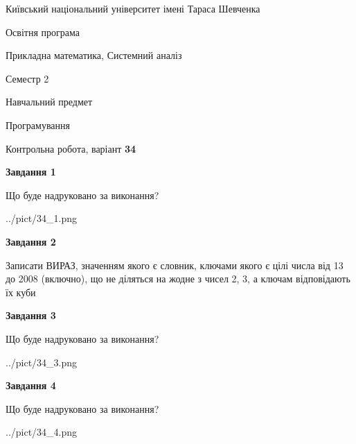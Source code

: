 \documentclass[12pt, ukrainian]{article}
\begin{document}
{{\begin {small}\par
{ \center  Київський національний університет імені Тараса Шевченка \par}
{\parbox {5 cm}{Освітня програма \hfill}{\parbox {8 cm}{Прикладна математика, Системний аналіз \hfill}}\parbox {5 cm}{\hfill Семестр 2}}\par
{\parbox {5 cm} {Навчальний предмет \hfill}\parbox {7 cm}{Програмування \hfill}\parbox {6cm}{\hfill}\par}\vspace{-7pt} \end{small}}{\center Контрольна робота, варіант  \No \textbf
{ 34 }\par}}
{
\begin {large}
{\begin {center}\textbf{Завдання 1}\end {center}}\par
Що буде надруковано за виконання?\par\par
\begin{center}
	{../pict/34_1.png}
\end{center}
\newpage

{\begin {center}\textbf{Завдання 2}\end {center}}\par
Записати ВИРАЗ, значенням якого є словник, ключами якого є цілі числа від 13 до 2008 (включно), що не діляться на жодне з чисел 2, 3, а ключам відповідають їх куби\par
\newpage

{\begin {center}\textbf{Завдання 3}\end {center}}\par
Що буде надруковано за виконання?\par
\begin{center}
	{../pict/34_3.png}
\end{center}
\newpage

{\begin {center}\textbf{Завдання 4}\end {center}}\par
Що буде надруковано за виконання?\par
\begin{center}
	{../pict/34_4.png}
\end{center}
\newpage


\end{large}}
\end{document}

